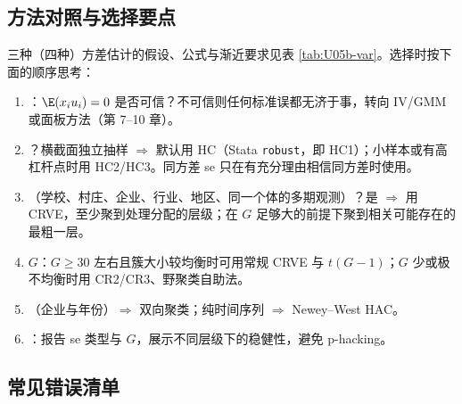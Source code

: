 \subsection{方法对照与选择要点}

三种（四种）方差估计的假设、公式与渐近要求见表 \ref{tab:U05b-var}。选择时按下面的顺序思考：

\begin{method}[如何选择标准误]
\begin{enumerate}
\item {}：$\E(x_iu_i)=0$ 是否可信？不可信则任何标准误都无济于事，转向 IV/GMM 或面板方法（第 7--10 章）。
\item {}？横截面独立抽样 $\Rightarrow$ 默认用 HC（Stata \texttt{robust}，即 HC1）；小样本或有高杠杆点时用 HC2/HC3。同方差 se 只在有充分理由相信同方差时使用。
\item {}（学校、村庄、企业、行业、地区、同一个体的多期观测）？是 $\Rightarrow$ 用 CRVE，至少聚到处理分配的层级；在 $G$ 足够大的前提下聚到相关可能存在的最粗一层。
\item {} $G$：$G\ge30$ 左右且簇大小较均衡时可用常规 CRVE 与 $t(G-1)$；$G$ 少或极不均衡时用 CR2/CR3、野聚类自助法。
\item {}（企业与年份）$\Rightarrow$ 双向聚类；纯时间序列 $\Rightarrow$ Newey--West HAC。
\item {}：报告 se 类型与 $G$，展示不同层级下的稳健性，避免 p-hacking。
\end{enumerate}
\end{method}

\subsection{常见错误清单}

